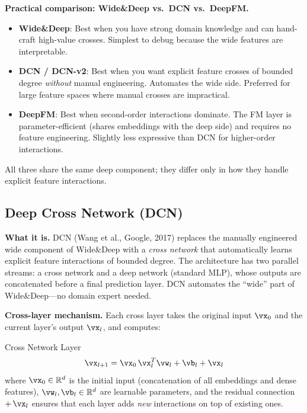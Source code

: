 \textbf{Practical comparison: Wide\&Deep vs.\ DCN vs.\ DeepFM.}
\begin{itemize}
    \item \textbf{Wide\&Deep}: Best when you have strong domain knowledge and can hand-craft high-value crosses. Simplest to debug because the wide features are interpretable.
    \item \textbf{DCN / DCN-v2}: Best when you want explicit feature crosses of bounded degree \textit{without} manual engineering. Automates the wide side. Preferred for large feature spaces where manual crosses are impractical.
    \item \textbf{DeepFM}: Best when second-order interactions dominate. The FM layer is parameter-efficient (shares embeddings with the deep side) and requires no feature engineering. Slightly less expressive than DCN for higher-order interactions.
\end{itemize}
All three share the same deep component; they differ only in how they handle explicit feature interactions.

\subsection{Deep Cross Network (DCN)}
\label{sec:dcn}

\textbf{What it is.} DCN (Wang et al., Google, 2017) replaces the manually engineered wide component of Wide\&Deep with a \textit{cross network} that automatically learns explicit feature interactions of bounded degree. The architecture has two parallel streams: a cross network and a deep network (standard MLP), whose outputs are concatenated before a final prediction layer. DCN automates the ``wide'' part of Wide\&Deep---no domain expert needed.

\textbf{Cross-layer mechanism.} Each cross layer takes the original input $\vx_0$ and the current layer's output $\vx_l$, and computes:

\begin{mathresult}{Cross Network Layer}
\begin{equation}
\vx_{l+1} = \vx_0 \, \vx_l^T \vw_l + \vb_l + \vx_l
\end{equation}
where $\vx_0 \in \mathbb{R}^d$ is the initial input (concatenation of all embeddings and dense features), $\vw_l, \vb_l \in \mathbb{R}^d$ are learnable parameters, and the residual connection $+\,\vx_l$ ensures that each layer adds \textit{new} interactions on top of existing ones.
\end{mathresult}

